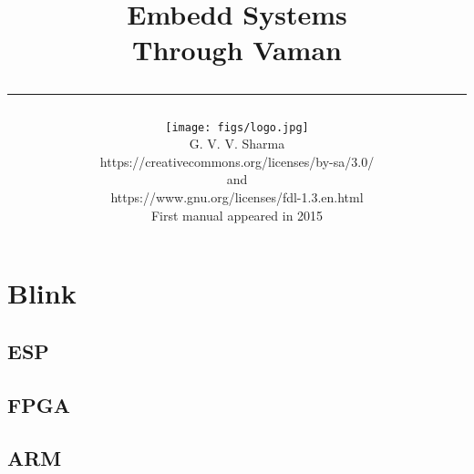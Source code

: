 \documentclass[journal]{IEEEtran}
\begin{document}

\onecolumn


\title{
	\begin{flushleft}
Embedd Systems\\ Through Vaman
	\\
\rule{0.4\columnwidth}{0.4pt}
\end{flushleft}
}
\author{
\vspace{7cm}
	\begin{flushleft}
\texttt{[image: figs/logo.jpg]}
\\
		{	\huge G. V. V. Sharma}
		\\
\vspace{1cm}
https://creativecommons.org/licenses/by-sa/3.0/
\\
and
\\
https://www.gnu.org/licenses/fdl-1.3.en.html
\\
First manual appeared in 2015
	\end{flushleft}
}
\maketitle

\newpage


\tableofcontents

\newpage
\twocolumn


\iffalse
\renewcommand{\thefigure}{\theenumi}
\renewcommand{\thetable}{\theenumi}
\renewcommand{\theequation}{\theenumi}
\fi


\section{Blink}
\subsection{ESP}

\subsection{FPGA}

\subsection{ARM}

\end{document}
